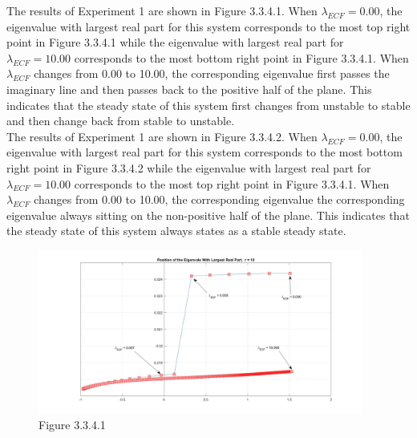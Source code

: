 \documentclass[12pt]{article}
\renewcommand{\(}{\left (}
\renewcommand{\)}{\right )}
\begin{document}
\vspace{5mm}

The results of Experiment 1 are shown in Figure 3.3.4.1. When $\lambda_{ECF} = 0.00$, the eigenvalue with largest real part for this system corresponds to the most top right point in Figure 3.3.4.1 while the eigenvalue with largest real part for $\lambda_{ECF} = 10.00$ corresponds to the most bottom right point in Figure 3.3.4.1. When $\lambda_{ECF}$ changes from 0.00 to 10.00, the corresponding eigenvalue first passes the imaginary line and then passes back to the positive half of the plane. This indicates that the steady state of this system first changes from unstable to stable and then change back from stable to unstable.\\

The results of Experiment 1 are shown in Figure 3.3.4.2. When $\lambda_{ECF} = 0.00$, the eigenvalue with largest real part for this system corresponds to the most bottom right point in Figure 3.3.4.2 while the eigenvalue with largest real part for $\lambda_{ECF} = 10.00$ corresponds to the most top right point in Figure 3.3.4.1. When $\lambda_{ECF}$ changes from 0.00 to 10.00, the corresponding eigenvalue the corresponding eigenvalue always sitting on the non-positive half of the plane. This indicates that the steady state of this system always states as a stable steady state.\\

\newpage

\begin{figure}[h!]
    \centering
	\begin{minipage}{0.99\textwidth}
		\centering
		\includegraphics[width=0.95\textwidth]{all_lambda_Ei.jpg}
		\caption*{\small Figure 3.3.4.1}
	\end{minipage}
\end{figure}
\end{document}
